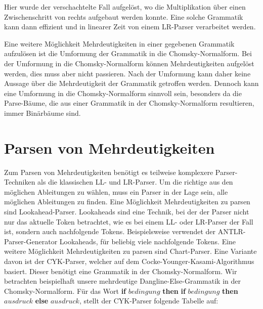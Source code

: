 \documentclass[runningheads]{llncs}
\begin{document}
    Hier wurde der verschachtelte Fall aufgelöst,
    wo die Multiplikation über einen Zwischenschritt von rechts aufgebaut werden konnte.
    Eine solche Grammatik kann dann effizient und in linearer Zeit von einem LR-Parser verarbeitet werden.

    Eine weitere Möglichkeit Mehrdeutigkeiten in einer gegebenen Grammatik aufzulösen
    ist die Umformung der Grammatik in die Chomsky-Normalform.
    Bei der Umformung in die Chomsky-Normalform können Mehrdeutigkeiten aufgelöst werden, dies muss aber nicht passieren\cite{kemp1974automata}.
    Nach der Umformung kann daher keine Aussage über die Mehrdeutigkeit der Grammatik getroffen werden.
    Dennoch kann eine Umformung in die Chomsky-Normalform sinnvoll sein, besonders da die Parse-Bäume,
    die aus einer Grammatik in der Chomsky-Normalform resultieren, immer Binärbäume sind\cite{watrous2020parse}.



    \newpage


    \section{Parsen von Mehrdeutigkeiten}\label{sec:parsen-von-mehrdeutigkeiten}

    Zum Parsen von Mehrdeutigkeiten benötigt es teilweise komplexere Parser-\\Techniken als die klassischen LL- und LR-Parser\cite{thorup1994controlled}.
    Um die richtige aus den möglichen Ableitungen zu wählen,
    muss ein Parser in der Lage sein, alle möglichen Ableitungen zu finden.
    Eine Möglichkeit Mehrdeutigkeiten zu parsen sind Lookahead-Parser.
    Lookaheads sind eine Technik, bei der der Parser nicht nur das aktuelle Token betrachtet,
    wie es bei einem LL- oder LR-Parser der Fall ist, sondern auch nachfolgende Tokens.
    Beispielsweise verwendet der ANTLR-Parser-Generator Lookaheads,
    für beliebig viele nachfolgende Tokens\cite{parr2024definitive}.
    Eine weitere Möglichkeit Mehrdeutigkeiten zu parsen sind Chart-Parser.
    Eine Variante davon ist der CYK-Parser\cite{klaus2009cky}, welcher auf dem Cocke-Younger-Kasami-Algorithmus basiert.
    Dieser benötigt eine Grammatik in der Chomsky-Normalform.
    Wir betrachten beispielhaft unsere mehrdeutige \glqq Dangline-Else\grqq{}-Grammatik in der Chomsky-Normalform.
    Für das Wort \glqq \textbf{if} $bedingung$ \textbf{then} \textbf{if} $bedingung$ \textbf{then} $ausdruck$ \textbf{else} $ausdruck$\grqq{},
    stellt der CYK-Parser folgende Tabelle auf:
\end{document}
